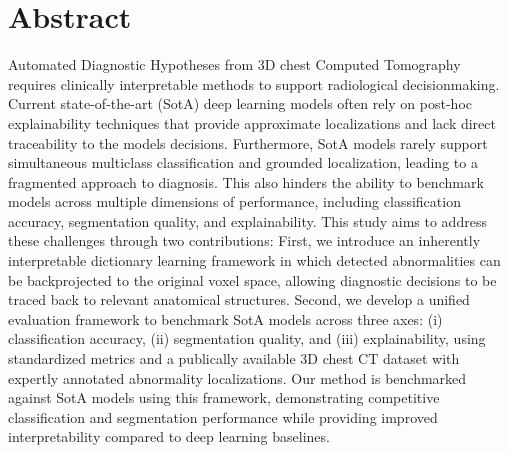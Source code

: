 ﻿
\chapter*{Abstract}
Automated Diagnostic Hypotheses from 3D chest Computed Tomography requires clinically interpretable methods to support radiological
decisionmaking.
Current state-of-the-art (SotA) deep learning models often rely on post-hoc explainability techniques that provide approximate localizations
and lack direct traceability to the models decisions.
Furthermore, SotA models rarely support simultaneous multiclass classification and grounded localization, leading to a fragmented
approach to diagnosis. This also hinders the ability to benchmark models across multiple dimensions of performance,
including classification accuracy, segmentation quality, and explainability.
This study aims to address these challenges through two contributions:
First, we introduce an inherently interpretable dictionary learning framework in which detected abnormalities can be
backprojected to the original voxel space, allowing diagnostic decisions to be traced back to relevant anatomical structures.
Second, we develop a unified evaluation framework to benchmark SotA models across three axes: (i) classification accuracy,
(ii) segmentation quality, and (iii) explainability, using standardized metrics and a publically available 3D chest CT dataset
with expertly annotated abnormality localizations.
Our method is benchmarked against SotA models using this framework, demonstrating competitive
classification and segmentation performance while providing improved interpretability compared to deep learning baselines.

